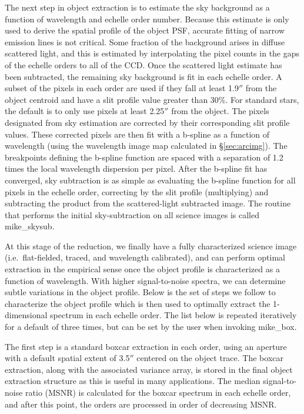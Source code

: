 \documentclass[12pt,preprint]{aastex}
\begin{document}
The next step in object extraction is to estimate the sky
background as a function of wavelength and echelle order number.  
Because this estimate is only used to derive the spatial profile
of the object PSF, accurate fitting of narrow emission lines is not
critical.
Some fraction of the background arises in diffuse scattered light, and
this is estimated by interpolating the pixel counts in the gaps of 
the echelle orders to all of the CCD.  Once the scattered light estimate
has been subtracted, the remaining sky background is fit in each echelle order.
A subset of the pixels in each order are used if they fall at least 1.9$''$ from
the object centroid and have a slit profile value greater than 30\%.
For standard stars, the default is to only use pixels at least 2.25$''$ from the
object.  The pixels designated from sky estimation are corrected by their
corresponding slit profile values.  These corrected pixels are then fit 
with a b-spline as a function of wavelength (using the wavelength image map 
calculated in \S\ref{sec:arcimg}).  The breakpoints defining the b-spline function
are spaced with a separation of 1.2 times the local wavelength dispersion
per pixel.  After the b-spline fit has converged, sky subtraction is as simple
as evaluating the b-spline function for all pixels in the echelle order, 
correcting by the slit profile (multiplying) and subtracting the product 
from the scattered-light subtracted image.
The routine that performs the initial sky-subtraction on all science images
is called mike\_skysub.

At this stage of the reduction, we finally have a fully characterized 
science image (i.e.\ flat-fielded, traced, and  
wavelength calibrated), and can perform optimal extraction in 
the empirical sense \citep[e.g.][]{optimal}
once the object profile is characterized as a function
of wavelength.  With higher signal-to-noise spectra,
we can determine subtle variations in the object profile.
Below is the set of steps we follow to characterize the object profile 
which is then used to optimally extract the 
1-dimensional spectrum in each echelle order. 
The list below is repeated iteratively for a default of three
times, but can be set by the user when invoking mike\_box.

The first step is a standard boxcar extraction in each order, using an aperture
with a default spatial extent of 3.5$''$ centered on the object trace.
The boxcar extraction, along with the associated variance array, is
stored in the final object extraction structure as this is useful in 
many applications.  The median signal-to-noise ratio (MSNR) is calculated 
for the boxcar spectrum in each echelle order, and after this point, 
the orders are processed in order of decreasing MSNR. 
\end{document}
